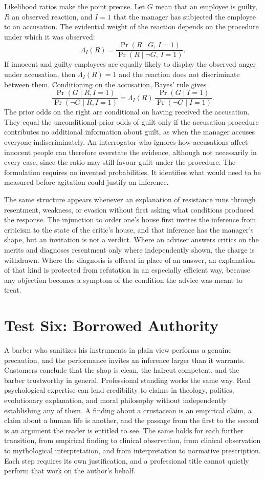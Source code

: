 \documentclass[12pt]{article}
\begin{document}
Likelihood ratios make the point precise. Let $G$ mean that an employee is guilty, $R$ an observed reaction, and $I=1$ that the manager has subjected the employee to an accusation. The evidential weight of the reaction depends on the procedure under which it was observed:
\[
\Lambda_I(R)=\frac{\Pr(R\mid G,\,I=1)}{\Pr(R\mid \neg G,\,I=1)}.
\]
If innocent and guilty employees are equally likely to display the observed anger under accusation, then $\Lambda_I(R)=1$ and the reaction does not discriminate between them. Conditioning on the accusation, Bayes' rule gives
\[
\frac{\Pr(G\mid R,I=1)}{\Pr(\neg G\mid R,I=1)}
=
\Lambda_I(R)\,
\frac{\Pr(G\mid I=1)}{\Pr(\neg G\mid I=1)}.
\]
The prior odds on the right are conditional on having received the accusation. They equal the unconditional prior odds of guilt only if the accusation procedure contributes no additional information about guilt, as when the manager accuses everyone indiscriminately. An interrogator who ignores how accusations affect innocent people can therefore overstate the evidence, although not necessarily in every case, since the ratio may still favour guilt under the procedure. The formulation requires no invented probabilities. It identifies what would need to be measured before agitation could justify an inference.

The same structure appears whenever an explanation of resistance runs through resentment, weakness, or evasion without first asking what conditions produced the response. The injunction to order one's house first invites the inference from criticism to the state of the critic's house, and that inference has the manager's shape, but an invitation is not a verdict. Where an adviser answers critics on the merits and diagnoses resentment only where independently shown, the charge is withdrawn. Where the diagnosis is offered in place of an answer, an explanation of that kind is protected from refutation in an especially efficient way, because any objection becomes a symptom of the condition the advice was meant to treat.

\section{Test Six: Borrowed Authority}\label{sec:t6}

A barber who sanitizes his instruments in plain view performs a genuine precaution, and the performance invites an inference larger than it warrants. Customers conclude that the shop is clean, the haircut competent, and the barber trustworthy in general. Professional standing works the same way. Real psychological expertise can lend credibility to claims in theology, politics, evolutionary explanation, and moral philosophy without independently establishing any of them. A finding about a crustacean is an empirical claim, a claim about a human life is another, and the passage from the first to the second is an argument the reader is entitled to see. The same holds for each further transition, from empirical finding to clinical observation, from clinical observation to mythological interpretation, and from interpretation to normative prescription. Each step requires its own justification, and a professional title cannot quietly perform that work on the author's behalf.
\end{document}
